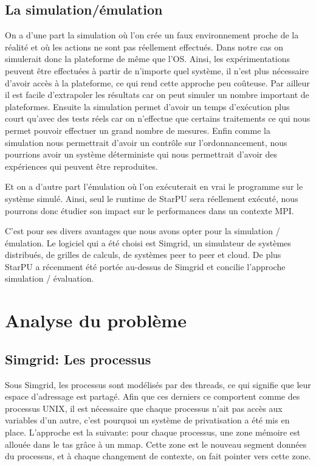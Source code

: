 \documentclass[smallextended]{svjour3}
\begin{document}
\subsection{La simulation/émulation}
\label{sec-2-3}
On a d'une part la simulation où l'on crée un faux environnement
proche de la réalité et où les actions ne sont pas réellement
effectués. Dans notre cas on simulerait donc la plateforme de même que l'OS. 
Ainsi, les expérimentations peuvent être effectuées à partir de
n'importe quel système, il n'est plus nécessaire d'avoir accès à la
plateforme, ce qui rend cette approche peu coûteuse. 
Par ailleur il est facile d'extrapoler les résultats car on peut
simuler un nombre important de plateformes. Ensuite la simulation
permet d'avoir un temps d'exécution plus court qu'avec des tests
réels car on n'effectue que certains traitements ce qui nous permet
pouvoir effectuer un grand nombre de mesures.  
Enfin comme la simulation nous permettrait d'avoir un contrôle sur
l'ordonnancement, nous pourrions avoir un système déterministe qui
nous permettrait d'avoir des expériences qui peuvent être reproduites.

Et on a d'autre part l'émulation où l'on exécuterait en vrai le
programme sur le système simulé. Ainsi, seul le runtime de StarPU sera
réellement exécuté, nous pourrons donc étudier son impact sur le
performances dans un contexte MPI.

C'est pour ses divers avantages que nous avons opter pour la
simulation / émulation. Le logiciel qui a été choisi est Simgrid, 
un simulateur de systèmes distribués, de grilles de calculs, de
systèmes peer to peer et cloud.
De plus StarPU a récemment été portée au-dessus de Simgrid et
concilie l'approche simulation /  évaluation.

\section{Analyse du problème}
\label{sec-3}
\subsection{Simgrid: Les processus}
\label{sec-3-1}
Sous Simgrid, les processus sont modélisés par des threads, ce
qui signifie que leur espace d'adressage est partagé.
Afin que ces derniers ce comportent comme des processus UNIX, il
est nécessaire que chaque processus n'ait pas accès aux
variables d'un autre, c'est pourquoi un système de
privatisation a été mis en place. L'approche est la suivante:
pour chaque processus, une zone mémoire est allouée dans le
tas grâce à un mmap. Cette zone est le nouveau segment données du
processus, et à chaque changement de contexte, on fait pointer
vers cette zone. 
\end{document}
